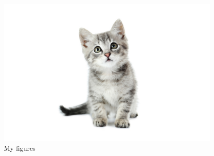 \documentclass[12pt]{article}
\begin{document}
\begin{figure}[ht]
\begin{minipage}[b]{0.49\linewidth}
 \includegraphics[width=1\textwidth]{./kitten4.jpg}
\end{minipage}%
\caption{My figures}
\end{figure}
\end{document}

